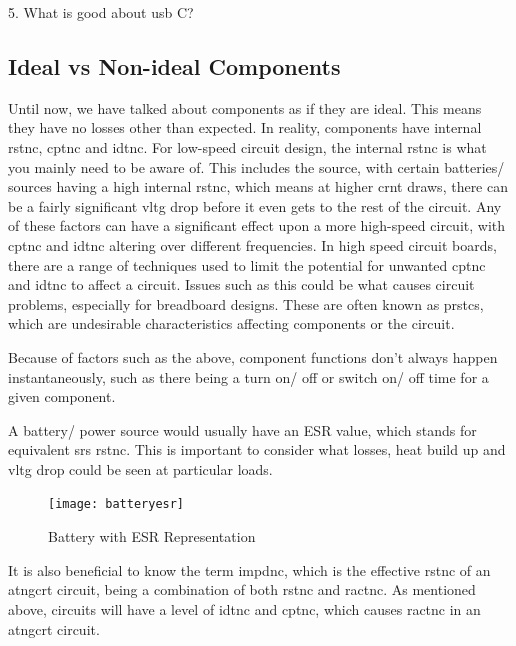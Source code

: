 \documentclass[a4paper,11pt]{report}
\newcommand{\Quiz}[1] %
{
\par\noindent %
\phantomsection %
\todo[inline, color=blue!30]{\textbf{#1}} %
\vspace{1em} %
}
\begin{document}
5. What is good about \gls{usb} C?

\vspace*{1\baselineskip}

\subsection{Ideal vs Non-ideal Components}

Until now, we have talked about components as if they are ideal. This means they have no losses other than expected. In reality, components have internal \gls{rstnc}, \gls{cptnc} and \gls{idtnc}. For low-speed circuit design, the internal \gls{rstnc} is what you mainly need to be aware of. This includes the source, with certain batteries/ sources having a high internal \gls{rstnc}, which means at higher \gls{crnt} draws, there can be a fairly significant \gls{vltg} drop before it even gets to the rest of the circuit. Any of these factors can have a significant effect upon a more high-speed circuit, with \gls{cptnc} and \gls{idtnc} altering over different frequencies. In high speed circuit boards, there are a range of techniques used to limit the potential for unwanted \gls{cptnc} and \gls{idtnc} to affect a circuit. Issues such as this could be what causes circuit problems, especially for breadboard designs. These are often known as \gls{prstcs}, which are undesirable characteristics affecting components or the circuit.

Because of factors such as the above, component functions don't always happen instantaneously, such as there being a turn on/ off or switch on/ off time for a given component.

A battery/ power source would usually have an ESR value, which stands for equivalent \gls{srs} \gls{rstnc}. This is important to consider what losses, heat build up and \gls{vltg} drop could be seen at particular loads.

\begin{figure}[H]
\centering
\texttt{[image: batteryesr]}
\caption{Battery with ESR Representation}
\end{figure}

It is also beneficial to know the term \gls{impdnc}, which is the effective \gls{rstnc} of an \gls{atngcrt} circuit, being a combination of both \gls{rstnc} and \gls{ractnc}. As mentioned above, circuits will have a level of \gls{idtnc} and \gls{cptnc}, which causes \gls{ractnc} in an \gls{atngcrt} circuit.

\Quiz{Quiz}
\end{document}
